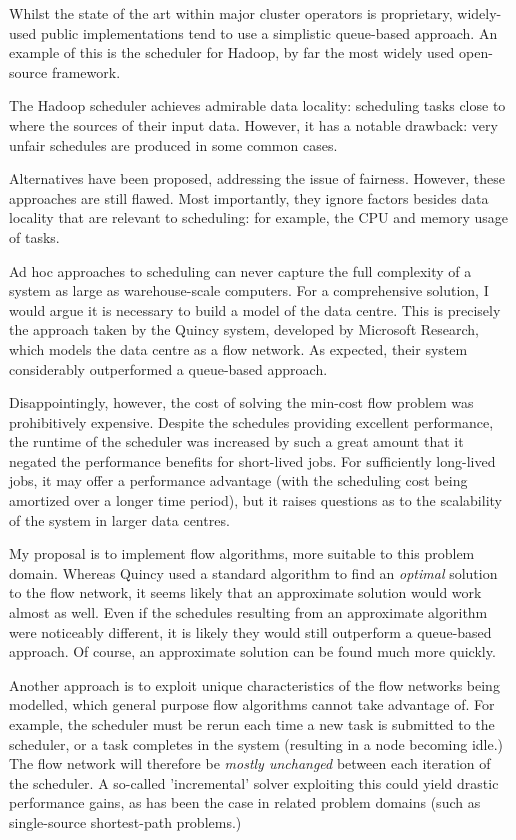 Whilst the state of the art within major cluster operators is proprietary, widely-used public implementations tend to use a simplistic queue-based approach. An example of this is the scheduler for Hadoop, by far the most widely used open-source framework.

The Hadoop scheduler achieves admirable data locality: scheduling tasks close to where the sources of their input data. However, it has a notable drawback: very unfair schedules are produced in some common cases.

Alternatives have been proposed, addressing the issue of fairness\cite{Zaharia:2010}. However, these approaches are still flawed. Most importantly, they ignore factors besides data locality that are relevant to scheduling: for example, the CPU and memory usage of tasks.

Ad hoc approaches to scheduling can never capture the full complexity of a system as large as warehouse-scale computers. For a comprehensive solution, I would argue it is necessary to build a model of the data centre. This is precisely the approach taken by the Quincy system, developed by Microsoft Research\cite{Isard:2009}, which models the data centre as a flow network. As expected, their system considerably outperformed a queue-based approach.

Disappointingly, however, the cost of solving the min-cost flow problem was prohibitively expensive. Despite the schedules providing excellent performance, the runtime of the scheduler was increased by such a great amount that it negated the performance benefits for short-lived jobs. For sufficiently long-lived jobs, it may offer a performance advantage (with the scheduling cost being amortized over a longer time period), but it raises questions as to the scalability of the system in larger data centres.

My proposal is to implement flow algorithms, more suitable to this problem domain. Whereas Quincy used a standard algorithm to find an \emph{optimal} solution to the flow network, it seems likely that an approximate solution would work almost as well. Even if the schedules resulting from an approximate algorithm were noticeably different, it is likely they would still outperform a queue-based approach. Of course, an approximate solution can be found much more quickly.

Another approach is to exploit unique characteristics of the flow networks being modelled, which general purpose flow algorithms cannot take advantage of. For example, the scheduler must be rerun each time a new task is submitted to the scheduler, or a task completes in the system (resulting in a node becoming idle.) The flow network will therefore be \emph{mostly unchanged} between each iteration of the scheduler. A so-called 'incremental' solver exploiting this could yield drastic performance gains, as has been the case in related problem domains (such as single-source shortest-path problems.) 

